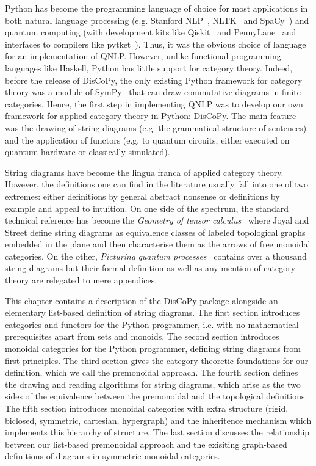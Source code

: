 
Python has become the programming language of choice for most applications in both natural language processing (e.g. Stanford NLP~\cite{ManningEtAl14}, NLTK~\cite{LoperBird02} and SpaCy~\cite{HonnibalMontani17}) and quantum computing (with development kits like Qiskit~\cite{Cross18} and PennyLane~\cite{BergholmEtAl20} and interfaces to compilers like pytket~\cite{SivarajahEtAl20}).
Thus, it was the obvious choice of language for an implementation of QNLP.
However, unlike functional programming languages like Haskell, Python has little support for category theory.
Indeed, before the release of DisCoPy, the only existing Python framework for category theory was a module of SymPy~\cite{MeurerEtAl17} that can draw commutative diagrams in finite categories.
Hence, the first step in implementing QNLP was to develop our own framework for applied category theory in Python: DisCoPy.
The main feature was the drawing of string diagrams (e.g. the grammatical structure of sentences) and the application of functors (e.g. to quantum circuits, either executed on quantum hardware or classically simulated).

String diagrams have become the lingua franca of applied category theory.
However, the definitions one can find in the literature usually fall into one of two extremes: either definitions by general abstract nonsense or definitions by example and appeal to intuition.
On one side of the spectrum, the standard technical reference has become the \emph{Geometry of tensor calculus}~\cite{JoyalStreet91} where Joyal and Street define string diagrams as equivalence classes of labeled topological graphs embedded in the plane and then characterise them as the arrows of free monoidal categories.
On the other, \emph{Picturing quantum processes}~\cite{CoeckeKissinger17} contains over a thousand string diagrams but their formal definition as well as any mention of category theory are relegated to mere appendices.

This chapter contains a description of the DisCoPy package alongside an elementary list-based definition of string diagrams.
The first section introduces categories and functors for the Python programmer, i.e. with no mathematical prerequisites apart from sets and monoids.
The second section introduces monoidal categories for the Python programmer, defining string diagrams from first principles.
The third section gives the category theoretic foundations for our definition, which we call the premonoidal approach.
The fourth section defines the drawing and reading algorithms for string diagrams, which arise as the two sides of the equivalence between the premonoidal and the topological definitions.
The fifth section introduces monoidal categories with extra structure (rigid, biclosed, symmetric, cartesian, hypergraph) and the inheritence mechanism which implements this hierarchy of structure.
The last section discusses the relationship between our list-based premonoidal approach and the exisiting graph-based definitions of diagrams in symmetric monoidal categories.
